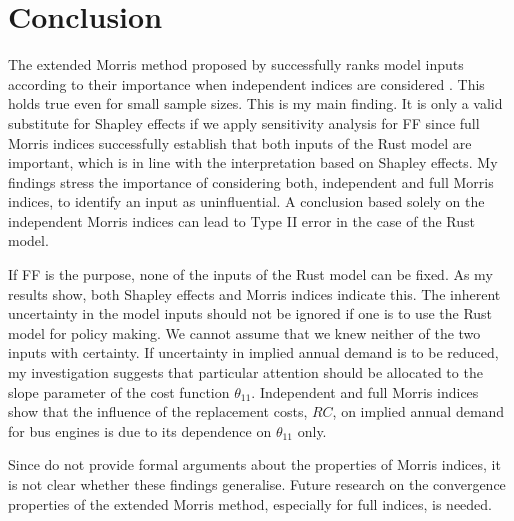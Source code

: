 \section{Conclusion} \label{conclusion}



The extended Morris method proposed by \citet{GM17} successfully ranks model inputs according to their importance when independent indices are considered . This holds true even for small sample sizes. This is my main finding. It is only a valid substitute for Shapley effects if we apply sensitivity analysis for FF since full Morris indices successfully establish that both inputs of the Rust model are important, which is in line with the interpretation based on Shapley effects. My findings stress the importance of considering both, independent and full Morris indices, to identify an input as uninfluential. A conclusion based solely on the independent Morris indices can lead to Type II error in the case of the Rust model.


If FF is the purpose, none of the inputs of the Rust model can be fixed. As my results show, both Shapley effects and Morris indices indicate this. The inherent uncertainty in the model inputs should not be ignored if one is to use the Rust model for policy making. We cannot assume that we knew neither of the two inputs with certainty. If uncertainty in implied annual demand is to be reduced, my investigation suggests that particular attention should be allocated to the slope parameter of the cost function $\theta_{11}$. Independent and full Morris indices show that the influence of the replacement costs, $RC$, on implied annual demand for bus engines is due to its dependence on $\theta_{11}$ only.


Since \citet{GM17} do not provide formal arguments about the properties of Morris indices, it is not clear whether these findings generalise. Future research on the convergence properties of the extended Morris method, especially for full indices, is needed.

